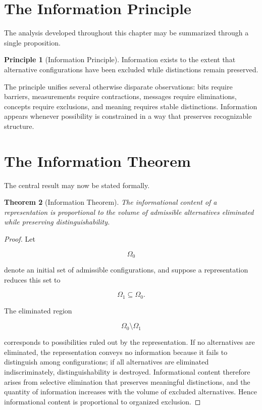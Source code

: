 \documentclass[11pt,oneside]{book}
\theoremstyle{plain}
\newtheorem{theorem}{Theorem}[chapter]
\theoremstyle{definition}
\newtheorem{principle}[theorem]{Principle}
\theoremstyle{remark}
\begin{document}
\section{The Information Principle}

The analysis developed throughout this chapter may be summarized through a single proposition.

\begin{principle}[Information Principle]
Information exists to the extent that alternative configurations have been excluded while distinctions remain preserved.
\end{principle}

The principle unifies several otherwise disparate observations: bits require barriers, measurements require contractions, messages require eliminations, concepts require exclusions, and meaning requires stable distinctions. Information appears whenever possibility is constrained in a way that preserves recognizable structure.

\section{The Information Theorem}

The central result may now be stated formally.

\begin{theorem}[Information Theorem]
The informational content of a representation is proportional to the volume of admissible alternatives eliminated while preserving distinguishability.
\end{theorem}

\begin{proof}
Let

\begin{equation}
\Omega_0
\end{equation}

denote an initial set of admissible configurations, and suppose a representation reduces this set to

\begin{equation}
\Omega_1
\subseteq
\Omega_0.
\end{equation}

The eliminated region

\begin{equation}
\Omega_0
\setminus
\Omega_1
\end{equation}

corresponds to possibilities ruled out by the representation. If no alternatives are eliminated, the representation conveys no information because it fails to distinguish among configurations; if all alternatives are eliminated indiscriminately, distinguishability is destroyed. Informational content therefore arises from selective elimination that preserves meaningful distinctions, and the quantity of information increases with the volume of excluded alternatives. Hence informational content is proportional to organized exclusion.
\end{proof}
\end{document}
